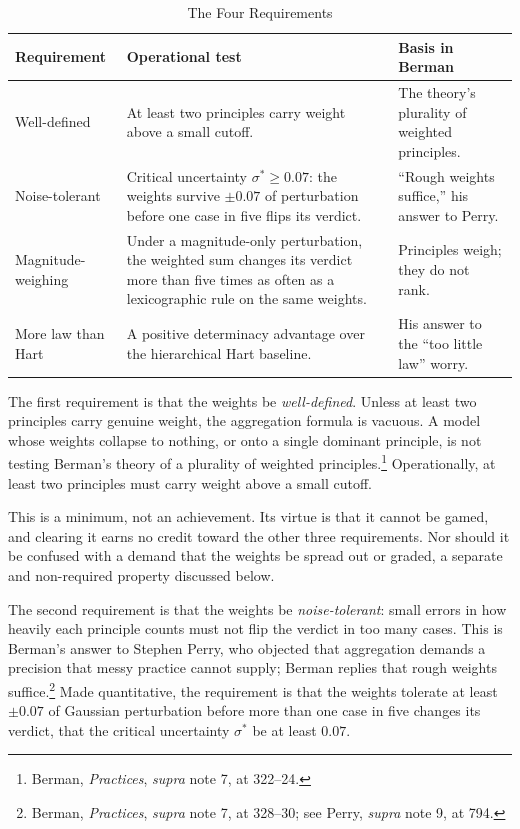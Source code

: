 \begin{table}[ht]
\centering
\small
\caption{The Four Requirements}
\label{tab:requirements}
\begin{tabular}{@{}p{3.4cm} p{5.2cm} p{4.3cm}@{}}
\toprule
\textbf{Requirement} & \textbf{Operational test} & \textbf{Basis in Berman} \\
\midrule
Well-defined & At least two principles carry weight above a small cutoff.
& The theory's plurality of weighted principles. \\
\addlinespace
Noise-tolerant & Critical uncertainty $\sigma^{*} \geq 0.07$: the weights
survive $\pm 0.07$ of perturbation before one case in five flips its
verdict. & ``Rough weights suffice,'' his answer to Perry. \\
\addlinespace
Magnitude-weighing & Under a magnitude-only perturbation, the weighted sum
changes
its verdict more than five times as often as a lexicographic rule on the
same weights. & Principles weigh; they do not rank. \\
\addlinespace
More law than Hart & A positive determinacy advantage over the
hierarchical Hart baseline. & His answer to the ``too little law''
worry. \\
\bottomrule
\end{tabular}
\end{table}

The first requirement is that the weights be \textit{well-defined}. Unless at least two principles carry genuine weight, the aggregation
formula is vacuous. A model whose weights collapse to nothing, or onto a
single dominant principle, is not testing Berman's theory of a plurality of
weighted principles.\footnote{Berman, \textit{Practices}, \textit{supra} note 7, at
322--24.} Operationally, at least two principles must carry weight above a
small cutoff.

This is a minimum, not an achievement. Its virtue is that it cannot be gamed,
and clearing it earns no credit toward the other three requirements. Nor
should it be confused with a demand that the weights be spread out or
graded, a separate and non-required property discussed below.

The second requirement is that the weights be \textit{noise-tolerant}: small
errors in how heavily each principle counts must not flip the verdict in too
many cases. This is Berman's answer to Stephen Perry, who objected that
aggregation demands a precision that messy practice cannot supply; Berman
replies that rough weights suffice.\footnote{Berman, \textit{Practices},
\textit{supra} note 7, at 328--30; see Perry, \textit{supra} note 9, at 794.} Made quantitative, the requirement is that the weights tolerate at
least $\pm 0.07$ of Gaussian perturbation before more than one case in five
changes its verdict, that the critical uncertainty $\sigma^{*}$ be at least
$0.07$.

